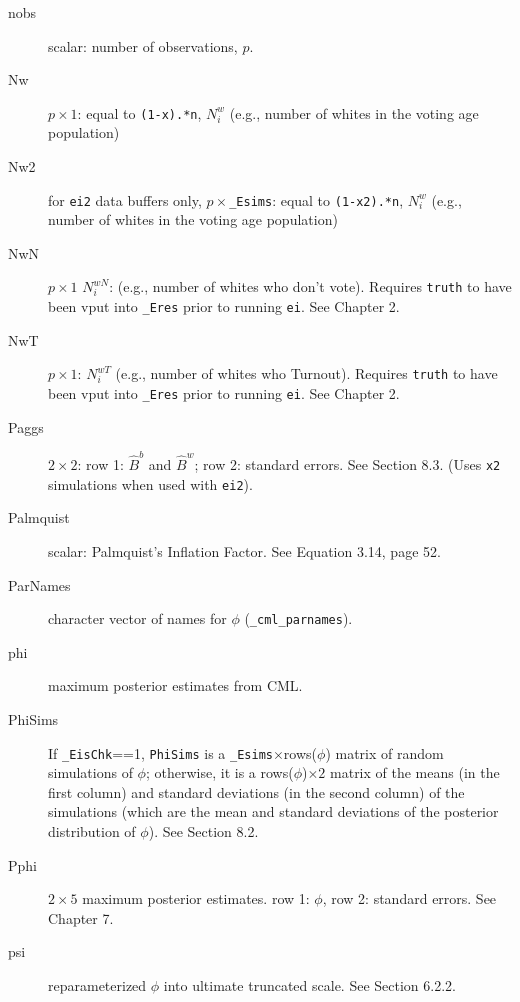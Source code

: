 \documentclass[11pt,titlepage]{article}
\newcommand{\NwN}{{N_i^{wN}}}
\newcommand{\Nwp}{{N_i^{w}}}
\newcommand{\NwV}{{N_i^{wT}}}
\begin{document}
\begin{description}
\item[nobs] scalar: number of observations, $p$.

\item[Nw] $p\times 1$: equal to \texttt{(1-x).*n}, $\Nwp$ (e.g.,
  number of whites in the voting age population)

\item[Nw2] for \texttt{ei2} data buffers only,
  $p\times$\texttt{\_Esims}: equal to \texttt{(1-x2).*n}, $\Nwp$
  (e.g., number of whites in the voting age population)

\item[NwN] $p\times1$ $\NwN$: (e.g., number of whites who don't vote).
  Requires \texttt{truth} to have been vput into \texttt{\_Eres} prior
  to running \texttt{ei}.  See Chapter 2.

\item[NwT] $p\times1$: $\NwV$ (e.g., number of whites who Turnout).
  Requires \texttt{truth} to have been vput into \texttt{\_Eres} prior
  to running \texttt{ei}. See Chapter 2.

\item[Paggs] $2\times 2$: row 1: $\hat{B}^b$ and $\hat{B}^w$; row 2:
  standard errors.  See Section 8.3.  (Uses \texttt{x2}
  simulations when used with \texttt{ei2}).

\item[Palmquist] scalar: Palmquist's Inflation Factor.  See Equation
  3.14, page 52.

\item[ParNames] character vector of names for $\phi$
  (\texttt{\_cml\_parnames}).

\item[phi] maximum posterior estimates from CML.

\item[PhiSims] If \texttt{\_EisChk}==1, \texttt{PhiSims} is a
  \texttt{\_Esims}$\times$rows($\phi$) matrix of random simulations of
  $\phi$; otherwise, it is a rows($\phi$)$\times 2$ matrix of the
  means (in the first column) and standard deviations (in the second
  column) of the simulations (which are the mean and standard
  deviations of the posterior distribution of $\phi$).  See Section
  8.2.

\item[Pphi] $2\times 5$ maximum posterior estimates.  row 1: $\phi$,
  row 2: standard errors.  See Chapter 7.

\item[psi] reparameterized $\phi$ into ultimate truncated scale.  See
  Section 6.2.2.


\end{description}
\end{document}
